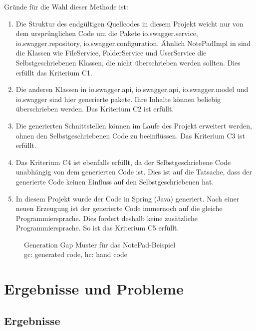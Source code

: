 \documentclass[a4paper,twoside]{article}
\begin{document}
	Gründe für die Wahl dieser Methode ist:
	\begin{enumerate}
		\item Die Struktur des endgültigen Quellcodes in diesem Projekt weicht nur von dem ursprünglichen Code um die Pakete io.swagger.service, io.swagger.repository, io.swagger.configuration. Ähnlich NotePadImpl in \cite{timo2015_3_1} sind die Klassen wie FileService, FolderService und UserService die Selbstgeschriebenen Klassen, die nicht überschrieben werden sollten. Dies erfüllt das Kriterium C1.
		
		\item Die anderen Klassen in io.swagger.api, io.swagger.api, io.swagger.model und io.swagger sind hier generierte pakete. Ihre Inhalte können beliebig überschrieben werden. Das Kriterium C2 ist erfüllt.
		
		\item Die generierten Schnittstellen können im Laufe des Projekt erweitert werden, ohnen den Selbstgeschriebenen Code zu beeinflüssen.  Das Kriterium C3 ist erfüllt.
		
		\item Das Kriterium C4 ist ebenfalls erfüllt, da der Selbstgeschriebene Code unabhängig von dem generierten Code ist. Dies ist auf die Tatsache, dass der generierte Code keinen Einfluss auf den Selbstgeschriebenen hat.
		
		\item In diesem Projekt wurde der Code in Spring (Java) generiert. Nach einer neuen Erzeugung ist der generierte Code immernoch auf die gleiche Programmiersprache. Dies fordert deshalb keine zusätzliche Programmiersprache. So ist das Kriterium C5 erfüllt.
	\end{enumerate}
	
	\begin{figure}[ht]
		\centering
		{}
		\caption{Generation Gap Muster für das NotePad-Beispiel\\ gc: generated code, hc: hand code}
		\label{fig:generation-gap-muster-für-das-notepad-beispiel}
	\end{figure}
	
	\section{Ergebnisse und Probleme}
	
	\subsection{Ergebnisse}
	
\end{document}
